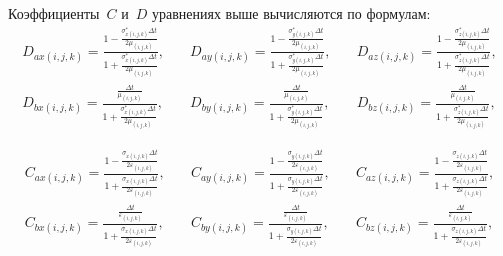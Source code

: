 Коэффициенты~$C$ и~$D$ уравнениях выше вычисляются по формулам:
\begin{equation*}
\begin{aligned}
D_{ax (i,j,k)} =
\frac
{
    1-\frac{\sigma_{x (i,j,k)}^*\Delta t}{2\mu_{(i,j,k)}}
}{
    1+\frac{\sigma_{x (i,j,k)}^*\Delta t}{2\mu_{(i,j,k)}}
}, \\
D_{bx (i,j,k)} =
\frac
{
    \frac{\Delta t}{\mu_{(i,j,k)}}
}{
    1+\frac{\sigma_{x (i,j,k)}^*\Delta t}{2\mu_{(i,j,k)}}
},
\end{aligned}
\quad
\begin{aligned}
D_{ay (i,j,k)} =
\frac
{
    1-\frac{\sigma_{y (i,j,k)}^*\Delta t}{2\mu_{(i,j,k)}}
}{
    1+\frac{\sigma_{y (i,j,k)}^*\Delta t}{2\mu_{(i,j,k)}}
}, \\
D_{by (i,j,k)} =
\frac
{
    \frac{\Delta t}{\mu_{(i,j,k)}}
}{
    1+\frac{\sigma_{y (i,j,k)}^*\Delta t}{2\mu_{(i,j,k)}}
},
\end{aligned}
\quad
\begin{aligned}
D_{az (i,j,k)} =
\frac
{
    1-\frac{\sigma_{z (i,j,k)}^*\Delta t}{2\mu_{(i,j,k)}}
}{
    1+\frac{\sigma_{z (i,j,k)}^*\Delta t}{2\mu_{(i,j,k)}}
}, \\
D_{bz (i,j,k)} =
\frac
{
    \frac{\Delta t}{\mu_{(i,j,k)}}
}{
    1+\frac{\sigma_{z (i,j,k)}^*\Delta t}{2\mu_{(i,j,k)}}
},
\end{aligned}
\end{equation*}

\begin{equation*}
\begin{aligned}
C_{ax (i,j,k)} =
\frac
{
    1-\frac{\sigma_{x (i,j,k)}\Delta t}{2\varepsilon_{(i,j,k)}}
}{
    1+\frac{\sigma_{x (i,j,k)}\Delta t}{2\varepsilon_{(i,j,k)}}
}, \\
C_{bx (i,j,k)} =
\frac
{
    \frac{\Delta t}{\varepsilon_{(i,j,k)}}
}{
    1+\frac{\sigma_{x (i,j,k)}\Delta t}{2\varepsilon_{(i,j,k)}}
},
\end{aligned}
\quad
\begin{aligned}
C_{ay (i,j,k)} =
\frac
{
    1-\frac{\sigma_{y (i,j,k)}\Delta t}{2\varepsilon_{(i,j,k)}}
}{
    1+\frac{\sigma_{y (i,j,k)}\Delta t}{2\varepsilon_{(i,j,k)}}
}, \\
C_{by (i,j,k)} =
\frac
{
    \frac{\Delta t}{\varepsilon_{(i,j,k)}}
}{
    1+\frac{\sigma_{y (i,j,k)}\Delta t}{2\varepsilon_{(i,j,k)}}
},
\end{aligned}
\quad
\begin{aligned}
C_{az (i,j,k)} =
\frac
{
    1-\frac{\sigma_{z (i,j,k)}\Delta t}{2\varepsilon_{(i,j,k)}}
}{
    1+\frac{\sigma_{z (i,j,k)}\Delta t}{2\varepsilon_{(i,j,k)}}
}, \\
C_{bz (i,j,k)} =
\frac
{
    \frac{\Delta t}{\varepsilon_{(i,j,k)}}
}{
    1+\frac{\sigma_{z (i,j,k)}\Delta t}{2\varepsilon_{(i,j,k)}}
},
\end{aligned}
\end{equation*}

